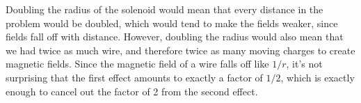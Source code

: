 Doubling the radius of the solenoid would mean that every distance in
the problem would be doubled, which would tend to make the fields
weaker, since fields fall off with distance. However, doubling the
radius would also mean that we had twice as much wire, and therefore
twice as many moving charges to create magnetic fields. Since the
magnetic field of a wire falls off like $1/r$, it's not surprising
that the first effect amounts to exactly a factor of $1/2$, which is
exactly enough to cancel out the factor of 2 from the second effect.
